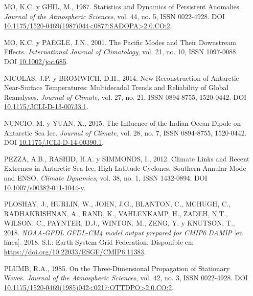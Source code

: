 \documentclass[12pt,oneside,a4paper]{reedthesis}
\newlength{\cslhangindent}
\newenvironment{CSLReferences}[2] %
 {%
  \setlength{\parindent}{0pt}
  \ifodd #1 \everypar{\setlength{\hangindent}{\cslhangindent}}\ignorespaces\fi
  \ifnum #2 > 0
  \setlength{\parskip}{#2\baselineskip}
  \fi
 }%
 {}
\begin{document}
\begin{CSLReferences}{1}{0}
\leavevmode{}%
MO, K.C. y GHIL, M., 1987. Statistics and {Dynamics} of {Persistent Anomalies}. \emph{Journal of the Atmospheric Sciences}, vol. 44, no. 5, ISSN 0022-4928. DOI \href{https://doi.org/10.1175/1520-0469(1987)044\%3C0877:SADOPA\%3E2.0.CO;2}{10.1175/1520-0469(1987)044\textless0877:SADOPA\textgreater2.0.CO;2}.

\leavevmode{}%
MO, K.C. y PAEGLE, J.N., 2001. The {Pacific} Modes and Their Downstream Effects. \emph{International Journal of Climatology}, vol. 21, no. 10, ISSN 1097-0088. DOI \href{https://doi.org/10.1002/joc.685}{10.1002/joc.685}.

\leavevmode{}%
NICOLAS, J.P. y BROMWICH, D.H., 2014. New {Reconstruction} of {Antarctic Near-Surface Temperatures}: {Multidecadal Trends} and {Reliability} of {Global Reanalyses}. \emph{Journal of Climate}, vol. 27, no. 21, ISSN 0894-8755, 1520-0442. DOI \href{https://doi.org/10.1175/JCLI-D-13-00733.1}{10.1175/JCLI-D-13-00733.1}.

\leavevmode{}%
NUNCIO, M. y YUAN, X., 2015. The {Influence} of the {Indian Ocean Dipole} on {Antarctic Sea Ice}. \emph{Journal of Climate}, vol. 28, no. 7, ISSN 0894-8755, 1520-0442. DOI \href{https://doi.org/10.1175/JCLI-D-14-00390.1}{10.1175/JCLI-D-14-00390.1}.

\leavevmode{}%
PEZZA, A.B., RASHID, H.A. y SIMMONDS, I., 2012. Climate Links and Recent Extremes in Antarctic Sea Ice, High-Latitude Cyclones, {Southern Annular Mode} and {ENSO}. \emph{Climate Dynamics}, vol. 38, no. 1, ISSN 1432-0894. DOI \href{https://doi.org/10.1007/s00382-011-1044-y}{10.1007/s00382-011-1044-y}.

\leavevmode{}%
PLOSHAY, J., HURLIN, W., JOHN, J.G., BLANTON, C., MCHUGH, C., RADHAKRISHNAN, A., RAND, K., VAHLENKAMP, H., ZADEH, N.T., WILSON, C., PAYNTER, D.J., WINTON, M., ZENG, Y. y KNUTSON, T., 2018. \emph{NOAA-GFDL GFDL-CM4 model output prepared for CMIP6 DAMIP} {[}en línea{]}. 2018. S.l.: Earth System Grid Federation. Disponible en: \url{https://doi.org/10.22033/ESGF/CMIP6.11383}.

\leavevmode{}%
PLUMB, R.A., 1985. On the {Three-Dimensional Propagation} of {Stationary Waves}. \emph{Journal of the Atmospheric Sciences}, vol. 42, no. 3, ISSN 0022-4928. DOI \href{https://doi.org/10.1175/1520-0469(1985)042\%3C0217:OTTDPO\%3E2.0.CO;2}{10.1175/1520-0469(1985)042\textless0217:OTTDPO\textgreater2.0.CO;2}.


\end{CSLReferences}
\end{document}

